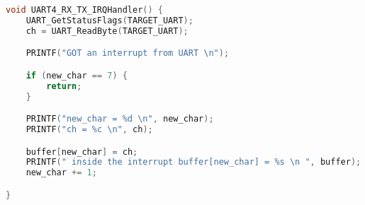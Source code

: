 \begin{lstlisting}[language=c,caption=Problem 3 UART4\_RX\_TX\_IRQHandler, label=list:p3_irqhandler]
void UART4_RX_TX_IRQHandler() {
    UART_GetStatusFlags(TARGET_UART);
    ch = UART_ReadByte(TARGET_UART);

    PRINTF("GOT an interrupt from UART \n");

    if (new_char == 7) {
        return;
    }

    PRINTF("new_char = %d \n", new_char);
    PRINTF("ch = %c \n", ch);

    buffer[new_char] = ch;
    PRINTF(" inside the interrupt buffer[new_char] = %s \n ", buffer);
    new_char += 1;

}
\end{lstlisting}